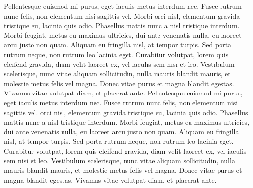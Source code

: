 \documentclass{article}
\begin{document}
  Pellentesque euismod mi purus, eget iaculis metus interdum nec.
 Fusce rutrum nunc felis, non elementum nisi sagittis vel.
 Morbi orci nisl, elementum gravida tristique eu, lacinia quis odio.
 Phasellus mattis nunc a nisl tristique interdum.
 Morbi feugiat, metus eu maximus ultricies, dui ante venenatis nulla, eu laoreet arcu justo non quam.
 Aliquam eu fringilla nisl, at tempor turpis.
 Sed porta rutrum neque, non rutrum leo lacinia eget.
 Curabitur volutpat, lorem quis eleifend gravida, diam velit laoreet ex, vel iaculis sem nisi et leo.
 Vestibulum scelerisque, nunc vitae aliquam sollicitudin, nulla mauris blandit mauris, et molestie metus felis vel magna.
 Donec vitae purus et magna blandit egestas.
 Vivamus vitae volutpat diam, et placerat ante.
Pellentesque euismod mi purus, eget iaculis metus interdum nec.
 Fusce rutrum nunc felis, non elementum nisi sagittis vel.
  orci nisl, elementum gravida tristique eu, lacinia quis odio.
 Phasellus mattis nunc a nisl tristique interdum.
 Morbi feugiat, metus eu maximus ultricies, dui ante venenatis nulla, eu laoreet arcu justo non quam.
 Aliquam eu fringilla nisl, at tempor turpis.
 Sed porta rutrum neque, non rutrum leo lacinia eget.
 Curabitur volutpat, lorem quis eleifend gravida, diam velit laoreet ex, vel iaculis sem nisi et leo.
 Vestibulum scelerisque, nunc vitae aliquam sollicitudin, nulla mauris blandit mauris, et molestie metus felis vel magna.
 Donec vitae purus et magna blandit egestas.
 Vivamus vitae volutpat diam, et placerat ante.

 


\endnumbering



\the\skip\Afootins

\the\skip\Bfootins
\end{document}
